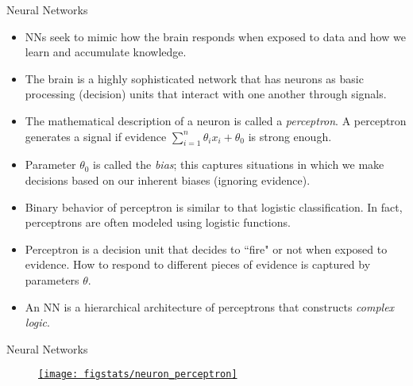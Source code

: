 \documentclass[handout,9pt]{beamer}
\begin{document}

\begin{frame}{Neural Networks}

\begin{itemize}
   \setlength{\itemsep}{5pt}
\item NNs seek to mimic how the brain responds when exposed to data and how we learn and accumulate knowledge. 

\item The brain is a highly sophisticated network that has neurons as basic processing (decision) units that interact with one another through signals. 

\item  The mathematical description of a neuron is called a {\em perceptron}. A perceptron generates a signal if evidence $\sum_{i=1}^n\theta_ix_i+\theta_0$ is strong enough. 

\item Parameter $\theta_0$ is called the {\em bias}; this captures situations in which we make decisions based on our inherent biases (ignoring evidence). 

\item Binary behavior of perceptron is similar to that logistic classification. In fact, perceptrons are often modeled using logistic functions. 

\item Perceptron is a decision unit that decides to ``fire" or not when exposed to evidence. How to respond to different pieces of evidence is captured by parameters $\theta$.   
 
\item An NN is a hierarchical architecture of perceptrons that constructs {\em complex logic}. 
\end{itemize}

\end{frame}


\begin{frame}{Neural Networks}

\begin{figure}[!htb]
    \centering
	\href{http://dataskunkworks.com/2018/03/22/building-an-artificial-neuron-in-python-the-perceptron}{\texttt{[image: figstats/neuron\_perceptron]}}
\end{figure}

\end{frame}
\end{document}
